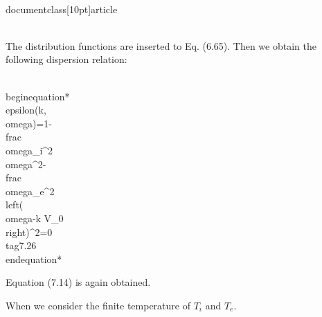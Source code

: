 \\documentclass[10pt]{article}
\begin{document}
{{{{\\[
\\begin{array}{r}
f_{i}(\\mathbf{v})=\\delta(\\mathbf{v}) \\\\
f_{e}(\\mathbf{v})=\\delta\\left(\\mathbf{v}-V_{0} \\hat{x}\\right) \\\\
f(\\mathbf{v})=f_{i}(\\mathbf{v})+f_{e}(\\mathbf{v}) \\tag{7.25}
\\end{array}
\\]

The distribution functions are inserted to Eq. (6.65). Then we obtain the following dispersion relation:


\\begin{equation*}
\\epsilon(k, \\omega)=1-\\frac{\\omega_{i}^{2}}{\\omega^{2}}-\\frac{\\omega_{e}^{2}}{\\left(\\omega-k V_{0}\\right)^{2}}=0 \\tag{7.26}
\\end{equation*}


Equation (7.14) is again obtained.

When we consider the finite temperature of $T_{i}$ and $T_{e}$.

}}}}
\end{document}
